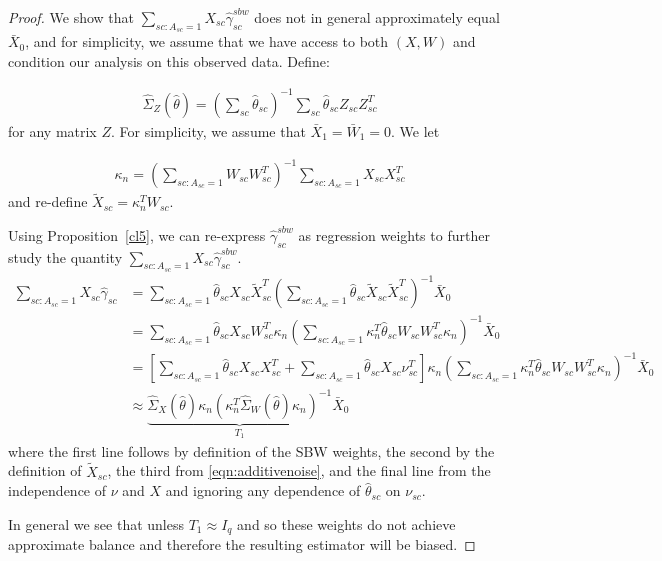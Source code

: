 \begin{proof}
    We show that $\sum_{sc: A_{sc} = 1}X_{sc}\hat{\gamma}^{sbw}_{sc}$ does not in general approximately equal $\bar{X}_0$, and for simplicity, we assume that we have access to both $(X, W)$ and condition our analysis on this observed data. Define:
    
    \begin{align*}
    \hat{\Sigma}_Z(\hat{\theta}) = (\sum_{sc} \hat{\theta}_{sc})^{-1}\sum_{sc}\hat{\theta}_{sc}Z_{sc}Z_{sc}^T
    \end{align*} 
    for any matrix $Z$. For simplicity, we assume that $\bar{X}_1 = \bar{W}_1 = 0$. We let 
    
    \begin{align*}
    \kappa_n = (\sum_{sc: A_{sc} = 1} W_{sc}W_{sc}^T)^{-1} \sum_{sc: A_{sc} = 1} X_{sc}X_{sc}^T
    \end{align*}
    and re-define $\tilde{X}_{sc} = \kappa_n^TW_{sc}$. 
    
    Using Proposition~\ref{cl5}, we can re-express $\hat{\gamma}^{sbw}_{sc}$ as regression weights to further study the quantity $\sum_{sc: A_{sc} = 1}X_{sc}\hat{\gamma}^{sbw}_{sc}$. 
    \begin{align}
        \nonumber\sum_{sc: A_{sc} = 1}X_{sc}\hat{\gamma}_{sc} &= \sum_{sc: A_{sc} = 1} \hat{\theta}_{sc}X_{sc}\tilde{X}_{sc}^T(\sum_{sc: A_{sc} = 1} \hat{\theta}_{sc}\tilde{X}_{sc}\tilde{X}_{sc}^T)^{-1}\bar{X}_0 \\
        \nonumber&= \sum_{sc: A_{sc} = 1} \hat{\theta}_{sc}X_{sc}W_{sc}^T\kappa_n(\sum_{sc: A_{sc} = 1} \kappa_n^T\hat{\theta}_{sc}W_{sc}W_{sc}^T\kappa_n)^{-1}\bar{X}_0\label{prop1a} \\
        \nonumber&= [\sum_{sc: A_{sc} = 1} \hat{\theta}_{sc}X_{sc}X_{sc}^T + \sum_{sc: A_{sc} = 1} \hat{\theta}_{sc}X_{sc}\nu_{sc}^T]\kappa_n(\sum_{sc: A_{sc} = 1} \kappa_n^T\hat{\theta}_{sc}W_{sc}W_{sc}^T\kappa_n)^{-1}\bar{X}_0\label{prop1a} \\
        \nonumber&\approx \underbrace{\hat{\Sigma}_X(\hat{\theta})\kappa_n(\kappa_n^T\hat{\Sigma}_W(\hat{\theta})\kappa_n)^{-1}}_{T_1}\bar{X}_0 \label{prop1d}
        \end{align}
    where the first line follows by definition of the SBW weights, the second by the definition of $\tilde{X}_{sc}$, the third from \eqref{eqn:additivenoise}, and the final line from the independence of $\nu$ and $X$ and ignoring any dependence of $\hat{\theta}_{sc}$ on $\nu_{sc}$.
    
    In general we see that unless $T_1 \approx I_q$ and so these weights do not achieve approximate balance and therefore the resulting estimator will be biased.
\end{proof}


